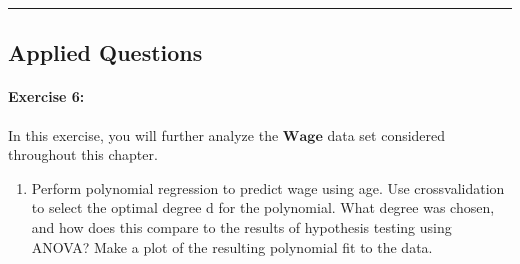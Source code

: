 \documentclass[
]{article}
\providecommand{\tightlist}{%
  \setlength{\itemsep}{0pt}\setlength{\parskip}{0pt}}
\begin{document}
\begin{center}\rule{0.5\linewidth}{0.5pt}\end{center}

\subsection{Applied Questions}\label{applied-questions}

\paragraph{Exercise 6:}\label{exercise-6}

In this exercise, you will further analyze the \(\mathbf{Wage}\) data
set considered throughout this chapter.

\begin{enumerate}
\def\labelenumi{(\alph{enumi})}
\tightlist
\item
  Perform polynomial regression to predict wage using age. Use
  crossvalidation to select the optimal degree d for the polynomial.
  What degree was chosen, and how does this compare to the results of
  hypothesis testing using ANOVA? Make a plot of the resulting
  polynomial fit to the data.
\end{enumerate}
\end{document}
